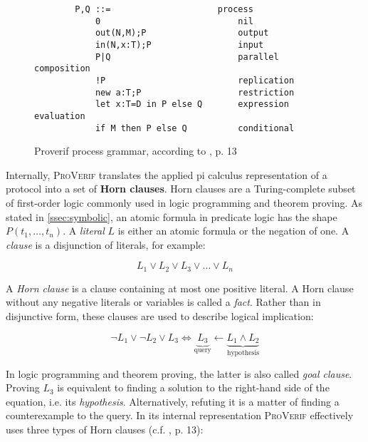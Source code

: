 \begin{figure}[h!]
    \centering
    \begin{lstlisting}
        P,Q ::=                     process
            0                           nil
            out(N,M);P                  output
            in(N,x:T);P                 input
            P|Q                         parallel composition
            !P                          replication
            new a:T;P                   restriction
            let x:T=D in P else Q       expression evaluation
            if M then P else Q          conditional
    \end{lstlisting}
    \caption{Proverif process grammar, according to \cite{blanchet2016modeling}, p. 13}
    \label{fig:pv-processes}
\end{figure}

Internally, \textsc{ProVerif} translates the applied pi calculus representation of a protocol into a set of \textbf{Horn clauses}.
Horn clauses are a Turing-complete subset of first-order logic commonly used in logic programming and theorem proving.
As stated in \ref{ssec:symbolic}, an atomic formula in predicate logic has the shape $P(t_1, \ldots, t_n)$.
A \textit{literal} $L$ is either an atomic formula or the negation of one.
A \textit{clause} is a disjunction of literals, for example:

\begin{equation}
    L_1 \vee L_2 \vee L_3 \vee \ldots \vee L_n
\end{equation}

\noindent
A \textit{Horn clause} is a clause containing at most one positive literal.
A Horn clause without any negative literals or variables is called a \textit{fact}.
Rather than in disjunctive form, these clauses are used to describe logical implication:

\begin{equation}
    \label{eq:implication}
    \lnot L_1 \vee \lnot L_2 \vee L_3 \Leftrightarrow  \underbrace{L_3}_\text{query} \leftarrow \underbrace{L_1 \wedge L_2}_\text{hypothesis}
\end{equation}

In logic programming and theorem proving, the latter is also called \textit{goal clause}.
Proving $L_3$ is equivalent to finding a solution to the right-hand side of the equation, i.e. its \textit{hypothesis}.
Alternatively, refuting it is a matter of finding a counterexample to the query.
In its internal representation \textsc{ProVerif} effectively uses three types of Horn clauses (c.f. \cite{blanchet2013automatic}, p. 13):

